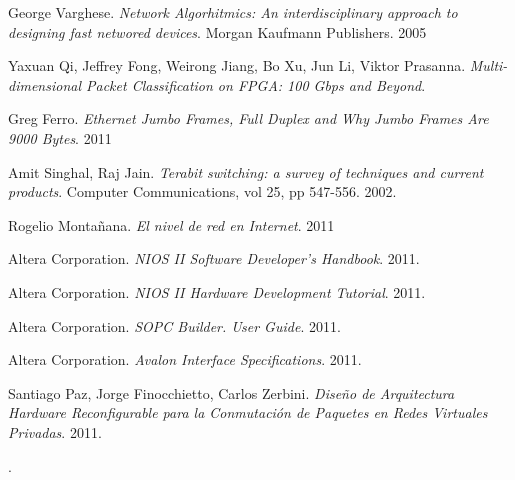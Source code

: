 \begin{thebibliography}{10}
 George Varghese. \textit{Network Algorhitmics: An interdisciplinary approach to designing fast networed devices}. Morgan Kaufmann Publishers. 2005 

Yaxuan Qi, Jeffrey Fong, Weirong Jiang, Bo Xu, Jun Li, Viktor Prasanna. \textit{Multi-dimensional Packet Classification on FPGA: 100 Gbps and Beyond}.

 Greg Ferro. \textit{Ethernet Jumbo Frames, Full Duplex and Why Jumbo Frames Are 9000 Bytes}. 2011

Amit Singhal, Raj Jain. \textit{Terabit switching: a survey of techniques and current products}. Computer Communications, vol 25, pp 547-556. 2002.


 Rogelio Montañana. \textit{El nivel de red en Internet}. 2011

 Altera Corporation. \textit{NIOS II Software Developer's Handbook}. 2011.

 Altera Corporation. \textit{NIOS II Hardware Development Tutorial}. 2011.

 Altera Corporation. \textit{SOPC Builder. User Guide}. 2011.

 Altera Corporation. \textit{Avalon Interface Specifications}. 2011.

 Santiago Paz, Jorge Finocchietto, Carlos Zerbini. \textit{Diseño de Arquitectura Hardware Reconfigurable para la Conmutación de Paquetes en Redes Virtuales Privadas}. 2011.


\end{thebibliography}.
